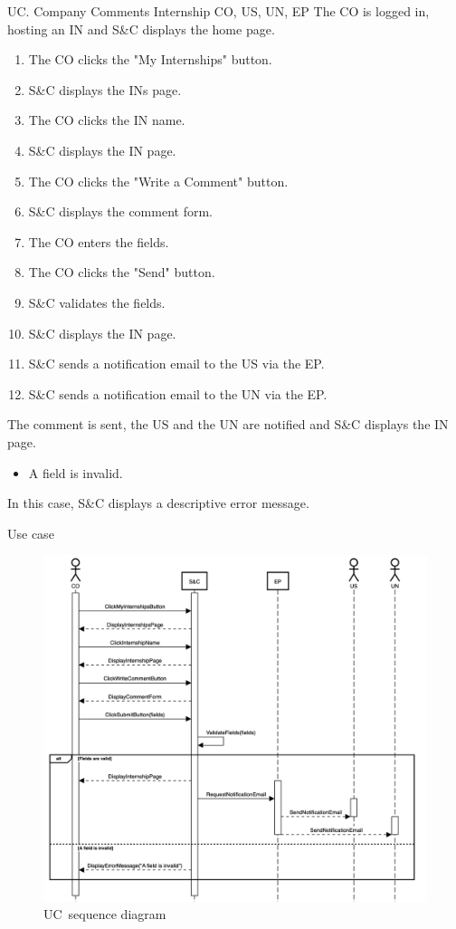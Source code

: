 \clearpage
\begin{usecase}
    {UC\theuc. Company Comments Internship}
    {CO, US, UN, EP}
    {The CO is logged in, hosting an IN and S\&C displays the home page.}
    {\begin{enumerate}[leftmargin=*]
        \item The CO clicks the "My Internships" button.
        \item S\&C displays the INs page.
        \item The CO clicks the IN name.
        \item S\&C displays the IN page.
        \item The CO clicks the "Write a Comment" button.
        \item S\&C displays the comment form.
        \item The CO enters the fields.
        \item The CO clicks the "Send" button.
        \item S\&C validates the fields.
        \item S\&C displays the IN page.
        \item S\&C sends a notification email to the US via the EP.
        \item S\&C sends a notification email to the UN via the EP.
    \end{enumerate}}
    {The comment is sent, the US and the UN are notified and S\&C displays the IN page.}
    {\begin{itemize}[leftmargin=*, label=\tiny\textbullet]
        \item A field is invalid.
    \end{itemize}
    In this case, S\&C displays a descriptive error message.}
    {Use case \theuc}
\end{usecase}

\begin{figure}
    \centering
    \includegraphics[width=16cm]{images/sequence-diagrams/company-comments-internship.png}
    \caption{UC\theuc\ sequence diagram}
\end{figure}

